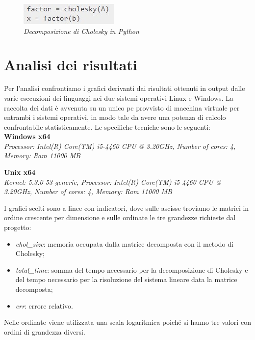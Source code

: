 \documentclass[a4paper,12pt]{article}
\begin{document}
\begin{figure}[H]
\centering
\includegraphics[width=0.4\linewidth]{img/python1.jpg}
\caption{\textit{Decomposizione di Cholesky in Python}}
\end{figure}

\newpage

\section{Analisi dei risultati}
Per l’analisi confrontiamo i grafici derivanti dai risultati ottenuti in output dalle varie esecuzioni dei linguaggi nei due sistemi operativi Linux e Windows. 
La raccolta dei dati è avvenuta su un unico pc provvisto di macchina virtuale per entrambi i sistemi operativi, in modo tale da avere una potenza di calcolo confrontabile statisticamente.
Le specifiche tecniche sono le seguenti: \\

\noindent \textbf{Windows x64} \\
\textit{Processor: Intel(R) Core(TM) i5-4460  CPU @ 3.20GHz, Number of cores: 4, Memory: Ram 11000 MB\\}

\noindent \textbf{Unix x64} \\
\textit{Kernel: 5.3.0-53-generic, Processor: Intel(R) Core(TM) i5-4460  CPU @ 3.20GHz, Number of cores: 4, Memory: Ram 11000 MB\\}


\noindent I grafici scelti sono a linee con indicatori, dove sulle ascisse troviamo le matrici in ordine crescente per dimensione e sulle ordinate le tre grandezze richieste dal progetto:
\begin{itemize}
\item \textit{chol\_size}: memoria occupata dalla matrice decomposta con il metodo di Cholesky;
\item \textit{total\_time}: somma del tempo necessario per la decomposizione di Cholesky e del tempo necessario per la risoluzione del sistema lineare data la matrice decomposta;
\item \textit{err}: errore relativo.
\end{itemize}
\bigskip

\noindent Nelle ordinate viene utilizzata una scala logaritmica poiché si hanno tre valori con ordini di grandezza diversi.
 
\end{document}

